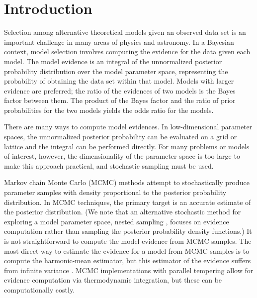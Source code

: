 \documentclass{iopart}
\begin{document}

\submitto{\CQG}

\maketitle

\section{Introduction}

Selection among alternative theoretical models given an observed data
set is an important challenge in many areas of physics and astronomy.
In a Bayesian context, model selection involves computing the evidence
for the data given each model.  The model evidence is an integral of
the unnormalized posterior probability distribution over the model
parameter space, representing the probability of obtaining the data
set within that model.  Models with larger evidence are preferred; the
ratio of the evidences of two models is the Bayes factor between them.
The product of the Bayes factor and the ratio of prior probabilities
for the two models yields the odds ratio for the models.

There are many ways to compute model evidences.  In low-dimensional
parameter spaces, the unnormalized posterior probability can be
evaluated on a grid or lattice and the integral can be performed
directly.  For many problems or models of interest, however, the
dimensionality of the parameter space is too large to make this approach
practical, and stochastic sampling must be used.  

Markov chain Monte Carlo (MCMC) methods attempt to stochastically
produce parameter samples with density proportional to the posterior
probability distribution.  In MCMC techniques, the primary target is
an accurate estimate of the posterior distribution.  (We note that an
alternative stochastic method for exploring a model parameter space,
nested sampling \cite{Skilling:2004,Skilling:2006,Feroz:2009},
focuses on evidence computation rather than sampling the posterior
probability density functions.)  It is not straightforward to compute
the model evidence from MCMC samples.  The most direct way to estimate
the evidence for a model from MCMC samples is to compute the
harmonic-mean estimator, but this estimator of the evidence suffers
from infinite variance
\cite{NewtonRaftery:1994,Chib:1995,vanHaasteren:2009}.  MCMC
implementations with parallel tempering \cite{EarlDeem:2005} allow
for evidence computation via thermodynamic integration, but these can
be computationally costly.
\end{document}
